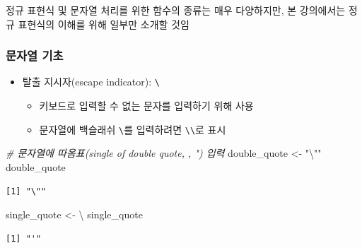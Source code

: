 \documentclass[
  11pt,
]{krantz}
\makeatletter
\newenvironment{Shaded}{\begin{snugshade}}{\end{snugshade}}
\newcommand{\CommentTok}[1]{\textcolor[rgb]{0.37,0.37,0.37}{\textit{#1}}}
\newcommand{\NormalTok}[1]{#1}
\newcommand{\OtherTok}[1]{\textcolor[rgb]{0.37,0.37,0.37}{#1}}
\newcommand{\SpecialCharTok}[1]{\textcolor[rgb]{0,0,0}{#1}}
\newcommand{\StringTok}[1]{\textcolor[rgb]{0.5,0.5,0.5}{#1}}
\providecommand{\tightlist}{%
  \setlength{\itemsep}{0pt}\setlength{\parskip}{0pt}}
\newenvironment{kframe}{%
\medskip{}
\setlength{\fboxsep}{.8em}
 \def\at@end@of@kframe{}%
 \ifinner\ifhmode%
  \def\at@end@of@kframe{\end{minipage}}%
  \begin{minipage}{\columnwidth}%
 \fi\fi%
 \def\FrameCommand##1{\hskip\@totalleftmargin \hskip-\fboxsep
 \colorbox{shadecolor}{##1}\hskip-\fboxsep
     \hskip-\linewidth \hskip-\@totalleftmargin \hskip\columnwidth}%
 \MakeFramed {\advance\hsize-\width
   \@totalleftmargin\z@ \linewidth\hsize
   \@setminipage}}%
 {\par\unskip\endMakeFramed%
 \at@end@of@kframe}
\newenvironment{rmdblock}[1]
  {
  \begin{itemize}
  \renewcommand{\labelitemi}{
    \raisebox{-.7\height}[0pt][0pt]{
      {\setkeys{Gin}{width=3em,keepaspectratio}\texttt{[image: images/\#1]}}
    }
  }
  \setlength{\fboxsep}{1em}
  \begin{kframe}
  \item
  }
  {
  \end{kframe}
  \end{itemize}
  }
\newenvironment{rmdnote}
  {\begin{rmdblock}{note}}
  {\end{rmdblock}}
\makeatother
\begin{document}
\footnotesize

\begin{rmdnote}
정규 표현식 및 문자열 처리를 위한 함수의 종류는 매우 다양하지만, 본 강의에서는 정규 표현식의 이해를 위해 일부만 소개할 것임
\end{rmdnote}

\normalsize

\hypertarget{string-basic}{%
\subsubsection*{\texorpdfstring{\textbf{문자열 기초}}{문자열 기초}}\label{string-basic}}


\begin{itemize}
\tightlist
\item
  탈출 지시자(escape indicator): \texttt{\textbackslash{}}

  \begin{itemize}
  \tightlist
  \item
    키보드로 입력할 수 없는 문자를 입력하기 위해 사용
  \item
    문자열에 백슬래쉬 \texttt{\textbackslash{}}를 입력하려면 \texttt{\textbackslash{}\textbackslash{}}로 표시
  \end{itemize}
\end{itemize}

\footnotesize

\begin{Shaded}
\begin{Highlighting}[]
\CommentTok{\# 문자열에 따옴표(single of double quote, \textquotesingle{}, ") 입력}
\NormalTok{double\_quote }\OtherTok{\textless{}{-}} \StringTok{"}\SpecialCharTok{\textbackslash{}"}\StringTok{"} 
\NormalTok{double\_quote}
\end{Highlighting}
\end{Shaded}

\begin{verbatim}
[1] "\""
\end{verbatim}

\begin{Shaded}
\begin{Highlighting}[]
\NormalTok{single\_quote }\OtherTok{\textless{}{-}} \StringTok{\textquotesingle{}}\SpecialCharTok{\textbackslash{}\textquotesingle{}}\StringTok{\textquotesingle{}} 
\NormalTok{single\_quote}
\end{Highlighting}
\end{Shaded}

\begin{verbatim}
[1] "'"
\end{verbatim}
\end{document}
